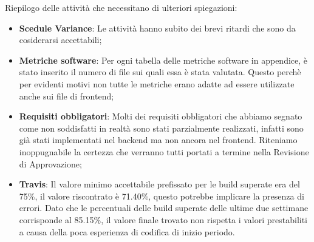 
Riepilogo delle attività che necessitano di ulteriori spiegazioni:
\begin{itemize}
    \item \textbf{Scedule Variance}: Le attività hanno subito dei brevi ritardi che sono da cosiderarsi accettabili;
    \item \textbf{Metriche software}: Per ogni tabella delle metriche software in appendice, è stato inserito 
    il numero di file sui quali essa è stata valutata.
    Questo perchè per evidenti motivi non tutte le metriche erano adatte ad essere utilizzate anche 
    sui file di frontend;
    \item \textbf{Requisiti obbligatori}: Molti dei requisiti obbligatori che abbiamo segnato come non 
    soddisfatti in realtà sono stati parzialmente realizzati, infatti sono già stati implementati nel
    backend ma non ancora nel frontend. Riteniamo inoppugnabile la certezza che verranno tutti portati 
    a termine nella Revisione di Approvazione;
    \item \textbf{Travis}: Il valore minimo accettabile prefissato per le build superate era del 75\%, il valore riscontrato
    è 71.40\%, questo potrebbe implicare la presenza di errori. Dato che le percentuali delle
    build superate delle ultime due settimane corrisponde al 85.15\%, il valore finale
    trovato non rispetta i valori prestabiliti a causa della poca esperienza di codifica di inizio periodo.
\end{itemize}
